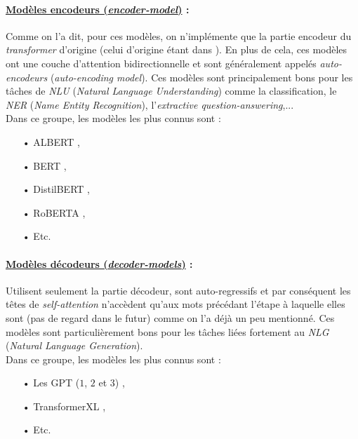 \paragraph{\underline{Modèles encodeurs (\textit{encoder-model})} :} Comme on l'a dit, pour ces modèles, on n'imp\-lé\-men\-te que la partie encodeur du \textit{transformer} d'origine (celui d'origine étant dans \cite{vaswani2017attention}). En plus de cela, ces modèles ont une couche d'attention bidirectionnelle et sont généralement appelés \textit{auto-encodeurs} (\textit{auto-encoding model}). Ces modèles sont principalement bons pour les tâches de \textit{NLU} (\textit{Natural Language Understanding}) comme la classification, le \textit{NER} (\textit{Name Entity Recognition}), l'\textit{extractive question-answering},...\\
Dans ce groupe, les modèles les plus connus sont :
\begin{itemize}
\item[•] ALBERT \cite{lan2019albert},
\item[•] BERT \cite{BERT_devlin2018bert},
\item[•] DistilBERT \cite{sanh2019distilbert},
\item[•] RoBERTA \cite{liu2019roberta},
\item[•] Etc.
\end{itemize}

\paragraph{\underline{Modèles décodeurs (\textit{decoder-models})} :}
Utilisent seulement la partie décodeur, sont auto-regressifs et par conséquent les têtes de \textit{self-attention} n'accèdent qu'aux mots précédant l'étape à laquelle elles sont (pas de regard dans le futur) comme on l'a déjà un peu mentionné. Ces modèles sont particulièrement bons pour les tâches liées fortement au \textit{NLG} (\textit{Natural Language Generation}).\\
Dans ce groupe, les modèles les plus connus sont :
\begin{itemize}
\item[•] Les GPT ($ 1 $, $ 2 $ et $ 3 $) \cite{GPT2_radford2019language},
\item[•] TransformerXL \cite{dai2019transformer},
\item[•] Etc.
\end{itemize}

